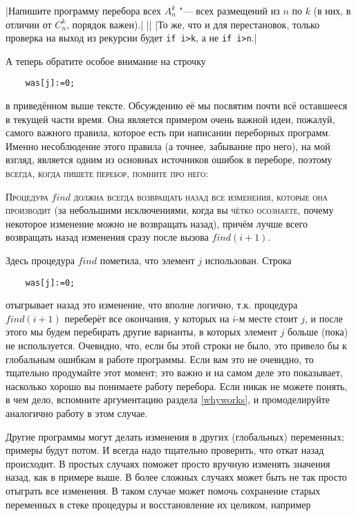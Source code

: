 |Напишите программу перебора всех $A_n^k$ "--- всех 
размещений из $n$ по $k$ (в них, в отличии от $C_n^k$, порядок важен).|
||
|То же, что и для перестановок, только проверка на выход из рекурсии будет \texttt{if i>k}, а не 
\texttt{if i>n}.|


А теперь обратите особое внимание на строчку
\begin{codesampleo}\begin{verbatim}
    was[j]:=0;
\end{verbatim}\end{codesampleo}
в приведённом выше тексте. Обсуждению её мы посвятим почти всё оставшееся в
текущей части время. Она является примером очень важной идеи, пожалуй, самого важного
правила, которое есть при написании переборных программ. Именно несоблюдение
этого правила (а точнее, забывание про него), на мой взгляд, является одним из
основных источников ошибок в переборе, поэтому \textsc{всегда, когда пишете перебор,
помните про него}:

\textsc{Процедура $find$ должна всегда возвращать назад все изменения, которые она 
производит} (за небольшими исключениями, когда вы \textsc{чётко осознаете}, почему 
некоторое изменение можно не возвращать назад), причём лучше всего возвращать 
назад изменения сразу после вызова $find(i+1)$.


Здесь процедура $find$ пометила, что элемент $j$ использован. Строка 
\begin{codesampleo}\begin{verbatim}
    was[j]:=0;
\end{verbatim}\end{codesampleo}
отыгрывает назад это изменение, что вполне логично, т.к. процедура $find(i+1)$ 
переберёт все окончания, у которых на $i$-м месте стоит $j$, и после этого мы будем 
перебирать другие варианты, в которых элемент $j$ больше (пока) не используется.
Очевидно, что, если бы этой строки не было, это привело бы к 
глобальным ошибкам в работе программы. Если вам это не очевидно, то тщательно продумайте этот 
момент; это важно и на самом деле это показывает, насколько хорошо вы понимаете работу перебора. 
Если никак не можете понять, в чем дело, вспомните аргументацию раздела \ref{whyworks}, 
и промоделируйте аналогично работу в этом случае.

Другие программы могут делать изменения в других (глобальных) переменных; 
примеры будут потом. И всегда надо тщательно проверить, что откат назад 
происходит. В простых случаях поможет просто вручную изменять значения назад, 
как в примере выше. В более сложных случаях может быть не так просто отыграть 
все изменения. В таком случае может помочь сохранение старых переменных в стеке 
процедуры и восстановление их целиком, например

